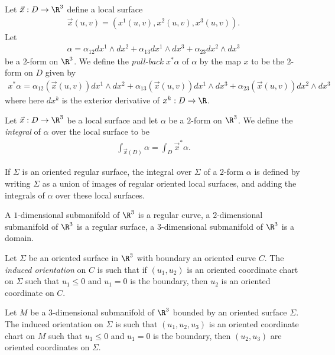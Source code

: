 \documentclass{article}
\begin{document}
\begin{definition}
	Let $\vec x:D\to\R^3$ define a local surface
	\begin{align*}
		\vec x(u,v)=(x^1(u,v), x^2(u,v), x^3(u,v)).
	\end{align*}
	Let
	\begin{align*}
		\alpha = \alpha_{12}dx^1\wedge dx^2 + \alpha_{13}dx^1\wedge dx^3 + \alpha_{23}dx^2\wedge dx^3
	\end{align*}
	be a $2$-form on $\R^3$. We define the \emph{pull-back} $x^*\alpha$ of $\alpha$ by the map $x$
	to be the $2$-form on $D$ given by
	\begin{align*}
		x^*\alpha = \alpha_{12}(\vec x(u,v))dx^1\wedge dx^2+ \alpha_{13}(\vec x(u,v))dx^1\wedge dx^3 + \alpha_{23}(\vec x(u,v))dx^2\wedge dx^3
	\end{align*}
	where here $dx^k$ is the exterior derivative of $x^k:D\to\R$.
\end{definition}

\begin{definition}
	Let $\vec x:D\to\R^3$ be a local surface and let $\alpha$ be a $2$-form on $\R^3$. We define
	the \emph{integral} of $\alpha$ over the local surface to be
	\begin{align*}
		\int_{\vec x(D)} \alpha = \int_D \vec x^*\alpha.
	\end{align*}
\end{definition}

\begin{definition}
	If $\Sigma$ is an oriented regular surface, the integral over $\Sigma$ of a $2$-form $\alpha$
	is defined by writing $\Sigma$ as a union of images of regular oriented local surfaces, and
	adding the integrals of $\alpha$ over these local surfaces.
\end{definition}

\begin{definition}
	A $1$-dimensional submanifold of $\R^3$ is a regular curve, a $2$-dimensional submanifold of
	$\R^3$ is a regular surface, a $3$-dimensional submanifold of $\R^3$ is a domain.
\end{definition}

\begin{definition}
	Let $\Sigma$ be an oriented surface in $\R^3$ with boundary an oriented curve $C$.
	The \emph{induced orientation} on $C$ is such that if $(u_1,u_2)$ is an oriented coordinate
	chart on $\Sigma$ such that $u_1\leq 0$ and $u_1=0$ is the boundary, then $u_2$ is an
	oriented coordinate on $C$.

	Let $M$ be a $3$-dimensional submanifold of $\R^3$ bounded by
	an oriented surface $\Sigma$. The induced orientation on $\Sigma$ is such that $(u_1,u_2,u_3)$
	is an oriented coordinate chart on $M$ such that $u_1\leq 0$ and $u_1=0$ is the boundary,
	then $(u_2,u_3)$ are oriented coordinates on $\Sigma$.
\end{definition}
\end{document}
